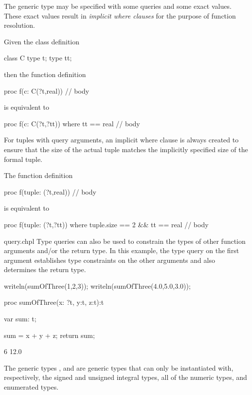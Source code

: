 The generic type may be specified with some queries and some exact
values.  These exact values result in \emph{implicit where clauses}
for the purpose of function resolution.
\begin{example}
Given the class definition
\begin{chapel}
class C {
  type t;
  type tt;
}
\end{chapel}
then the function definition
\begin{chapel}
proc f(c: C(?t,real)) {
  // body
}
\end{chapel}
is equivalent to
\begin{chapel}
proc f(c: C(?t,?tt)) where tt == real {
  // body
}
\end{chapel}
\end{example}
For tuples with query arguments, an implicit where clause is always
created to ensure that the size of the actual tuple matches the
implicitly specified size of the formal tuple.
\begin{example}
The function definition
\begin{chapel}
proc f(tuple: (?t,real)) {
  // body
}
\end{chapel}
is equivalent to
\begin{chapel}
proc f(tuple: (?t,?tt)) where tuple.size == 2 && tt == real {
  // body
}
\end{chapel}
\end{example}

\begin{chapelexample}{query.chpl}
Type queries can also be used to constrain the types of other function arguments
and/or the return type.  In this example, the type query on the first argument
establishes type constraints on the other arguments and also determines the
return type.
\begin{chapel}
writeln(sumOfThree(1,2,3));
writeln(sumOfThree(4.0,5.0,3.0));

proc sumOfThree(x: ?t, y:t, z:t):t {
   var sum: t;
   
   sum = x + y + z;
   return sum;
}
\end{chapel}
\begin{chapelprintoutput}
6
12.0
\end{chapelprintoutput}
\end{chapelexample}

The generic types ,  and 
are generic types that can only be instantiated with, respectively, the
signed and unsigned integral types, all of the numeric types, and
enumerated types.

